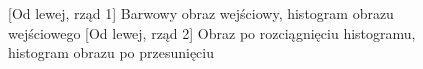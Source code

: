\documentclass[a4paper,12pt, titlepage]{report}
\begin{document}
\FloatBarrier
\begin{figure}[h]
    \centering
    \qquad
    \caption{[Od lewej, rząd 1] Barwowy obraz wejściowy, histogram obrazu wejściowego [Od lewej, rząd 2] Obraz po rozciągnięciu histogramu, histogram obrazu po przesunięciu}%
    \label{fig:geo_after_grey1}%
\end{figure}
\FloatBarrier
\end{document}

